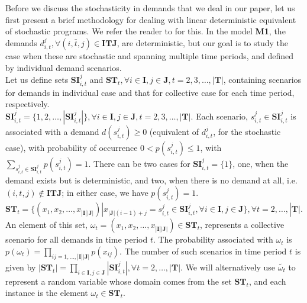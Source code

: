 \documentclass[12pt,a4paper]{article}
\begin{document}
Before we discuss the stochasticity in demands that we deal in our paper, let us first present a brief methodology for dealing with linear deterministic equivalent of stochastic programs. We refer the reader to \cite{Dantzig1993} for this. In the model \textbf{M1}, the demands $d_{i,t}^{j}, \forall (i,\bar{t},j)\in \textbf{ITJ}$, are deterministic, but our goal is to study the case when these are stochastic and spanning multiple time periods, and defined by individual demand scenarios. \\
Let us define sets $\textbf{SI}_{i,t}^{j}$ and $\textbf{ST}_{t}, \forall i\in \textbf{I}, j\in \textbf{J}, t=2,3,\ldots ,|\textbf{T}|$, containing scenarios for demands in individual case and that for collective case for each time period, respectively. \\
$\textbf{SI}_{i,t}^{j}=\{1,2,\ldots ,|\textbf{SI}_{i,t}^{j}|\}, \forall i\in \textbf{I}, j\in \textbf{J}, t=2,3,\ldots ,|\textbf{T}|$. Each scenario, $s_{i,t}^{j}\in \textbf{SI}_{i,t}^{j}$ is associated with a demand $d(s_{i,t}^{j})\geq 0$ (equivalent of $d_{i,t}^{j}$, for the stochastic case), with probability of occurrence $0<p(s_{i,t}^{j})\leq 1$, with $\sum_{s_{i,t}^{j}\in \textbf{SI}_{i,t}^{j}} p(s_{i,t}^{j})=1$. There can be two cases for $\textbf{SI}_{i,t}^{j}=\{1\}$, one, when the demand exists but is deterministic, and two, when there is no demand at all, i.e. $(i,t,j)\not \in \textbf{ITJ}$; in either case, we have $p(s_{i,t}^{j})=1$. \\
$\textbf{ST}_{t}=\{(x_{1},x_{2},\ldots,x_{|\textbf{I}||\textbf{J}|})|x_{|\textbf{J}|(i-1)+j}=s_{i,t}^{j}\in \textbf{SI}_{i,t}^{j}, \forall i\in \textbf{I},j\in \textbf{J}\}, \forall t=2,\ldots ,|\textbf{T}|$. An element of this set, $\omega_{t}=(x_{1},x_{2},\ldots,x_{|\textbf{I}||\textbf{J}|})\in \textbf{ST}_{t}$, represents a collective scenario for all demands in time period $t$. The probability associated with $\omega_t$ is $p(\omega_t)=\prod_{ij=1,\ldots ,|\textbf{I}||\textbf{J}|} p(x_{ij})$. The number of such scenarios in time period $t$ is given by $|\textbf{ST}_{t}|=\prod_{i\in \textbf{I},j\in \textbf{J}} |\textbf{SI}_{i,t}^{j}|, \forall t=2,\ldots ,|\textbf{T}|$. We will alternatively use $\tilde{\omega_t}$ to represent a random variable whose domain comes from the set $\textbf{ST}_t$, and each instance is the element $\omega_t\in \textbf{ST}_t$.\\
\end{document}
